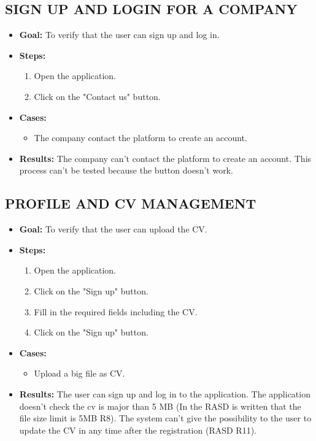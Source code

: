 \subsection{SIGN UP AND LOGIN FOR A COMPANY}\label{subsec:sign-up-and-login-for-a-company}
\begin{itemize}
    \item \textbf{Goal:} To verify that the user can sign up and log in.

    \item \textbf{Steps:}
    \begin{enumerate}
        \item Open the application.
        \item Click on the "Contact us" button.
    \end{enumerate}
    \item \textbf{Cases:}
    \begin{itemize}
        \item The company contact the platform to create an account.
    \end{itemize}
    \item \textbf{Results:} The company can't contact the platform to create an account.
    This process can't be tested because the button doesn't work.
\end{itemize}

\subsection{PROFILE AND CV MANAGEMENT}\label{subsec:profile-and-cv-management}
\begin{itemize}
    \item \textbf{Goal:} To verify that the user can upload the CV.

    \item \textbf{Steps:}
    \begin{enumerate}
        \item Open the application.
        \item Click on the "Sign up" button.
        \item Fill in the required fields including the CV.
        \item Click on the "Sign up" button.
    \end{enumerate}
    \item \textbf{Cases:}
    \begin{itemize}
        \item Upload a big file as CV.
    \end{itemize}
    \item \textbf{Results:} The user can sign up and log in to the application.
    The application doesn't check the cv is major than 5 MB (In the RASD is written that the file size limit is 5MB R8).
    The system can't give the possibility to the user to update the CV in any time after the registration (RASD R11).
\end{itemize}


